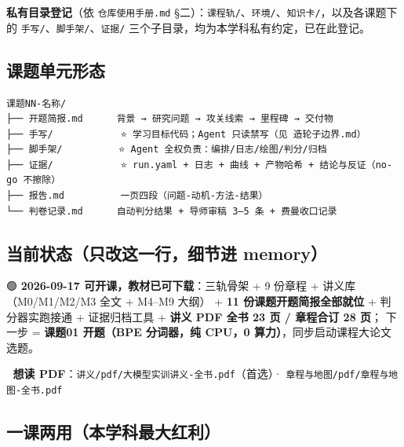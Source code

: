 \documentclass[
  chinese,
  11pt,
]{ctexart}
\begin{document}
\textbf{私有目录登记}（依 \texttt{仓库使用手册.md} §二）：\texttt{课程轨/}、\texttt{环境/}、\texttt{知识卡/}，以及各课题下的 \texttt{手写/}、\texttt{脚手架/}、\texttt{证据/} 三个子目录，均为本学科私有约定，已在此登记。

\subsection{课题单元形态}\label{ux8bfeux9898ux5355ux5143ux5f62ux6001}

\begin{verbatim}
课题NN-名称/
├── 开题简报.md      背景 → 研究问题 → 攻关线索 → 里程碑 → 交付物
├── 手写/            ⭐ 学习目标代码；Agent 只读禁写（见 造轮子边界.md）
├── 脚手架/          ⭐ Agent 全权负责：编排/日志/绘图/判分/归档
├── 证据/            ⭐ run.yaml + 日志 + 曲线 + 产物哈希 + 结论与反证（no-go 不擦除）
├── 报告.md          一页四段（问题-动机-方法-结果）
└── 判卷记录.md      自动判分结果 + 导师审稿 3–5 条 + 费曼收口记录
\end{verbatim}

\subsection{当前状态（只改这一行，细节进 memory）}\label{ux5f53ux524dux72b6ux6001ux53eaux6539ux8fd9ux4e00ux884cux7ec6ux8282ux8fdb-memory}

🟢 \textbf{2026-09-17 可开课，教材已可下载}：三轨骨架 + 9 份章程 + 讲义库（M0/M1/M2/M3 全文 + M4--M9 大纲） + \textbf{11 份课题开题简报全部就位} + 判分器实跑接通 + 证据归档工具 + \textbf{讲义 PDF 全书 23 页 / 章程合订 28 页}； 下一步 = \textbf{课题01 开题（BPE 分词器，纯 CPU，0 算力）}，同步启动课程大论文选题。

📕 \textbf{想读 PDF}：\texttt{讲义/pdf/大模型实训讲义-全书.pdf}（首选）· \texttt{章程与地图/pdf/章程与地图-全书.pdf}

\subsection{一课两用（本学科最大红利）}\label{ux4e00ux8bfeux4e24ux7528ux672cux5b66ux79d1ux6700ux5927ux7ea2ux5229}
\end{document}
